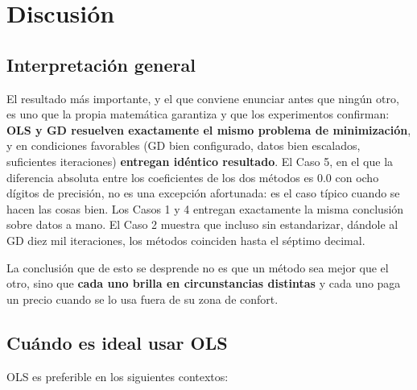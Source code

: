 \documentclass[11pt,a4paper]{article}
\begin{document}
\section{Discusión}
\label{sec:discusion}

\subsection{Interpretación general}

El resultado más importante, y el que conviene enunciar antes que ningún otro, es uno que la propia matemática garantiza y que los experimentos confirman: \textbf{OLS y GD resuelven exactamente el mismo problema de minimización}, y en condiciones favorables (GD bien configurado, datos bien escalados, suficientes iteraciones) \textbf{entregan idéntico resultado}. El Caso 5, en el que la diferencia absoluta entre los coeficientes de los dos métodos es 0.0 con ocho dígitos de precisión, no es una excepción afortunada: es el caso típico cuando se hacen las cosas bien. Los Casos 1 y 4 entregan exactamente la misma conclusión sobre datos a mano. El Caso 2 muestra que incluso sin estandarizar, dándole al GD diez mil iteraciones, los métodos coinciden hasta el séptimo decimal.

La conclusión que de esto se desprende no es que un método sea mejor que el otro, sino que \textbf{cada uno brilla en circunstancias distintas} y cada uno paga un precio cuando se lo usa fuera de su zona de confort.

\subsection{Cuándo es ideal usar OLS}

OLS es preferible en los siguientes contextos:
\end{document}
